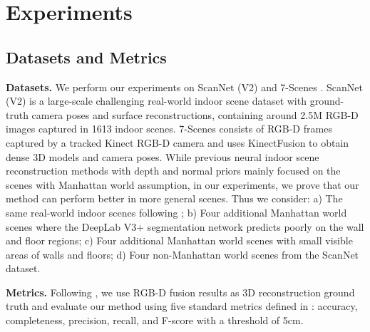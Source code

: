 \documentclass[10pt,journal,compsoc]{IEEEtran}
\begin{document}
\section{Experiments}
\label{sec:exp}

\subsection{Datasets and Metrics}
\noindent\textbf{Datasets.} We perform our experiments on ScanNet (V2) \cite{dai2017scannet} and 7-Scenes \cite{shotton2013scene}. ScanNet (V2) is a large-scale challenging real-world indoor scene dataset with ground-truth camera poses and surface reconstructions, containing around 2.5M RGB-D images captured in 1613 indoor scenes. 7-Scenes consists of RGB-D frames captured by a tracked Kinect RGB-D camera and uses KinectFusion \cite{izadi2011kinectfusion} to obtain dense 3D models and camera poses. 
While previous neural indoor scene reconstruction methods with depth and normal priors mainly focused on the scenes with Manhattan world assumption, in our experiments, we prove that our method can perform better in more general scenes. Thus we consider: a) The same real-world indoor scenes following \cite{guo2022neural}; b) Four additional Manhattan world scenes where the DeepLab V3+ segmentation network predicts poorly on the wall and floor regions; c) Four additional Manhattan world scenes with small visible areas of walls and floors; d) Four non-Manhattan world scenes from the ScanNet dataset.

\noindent\textbf{Metrics.} Following \cite{guo2022neural, sun2021neuralrecon, yu2022monosdf}, we use RGB-D fusion results as 3D reconstruction ground truth and evaluate our method using five standard metrics defined in \cite{murez2020atlas}: accuracy, completeness, precision, recall, and F-score with a threshold of 5cm.
\end{document}
